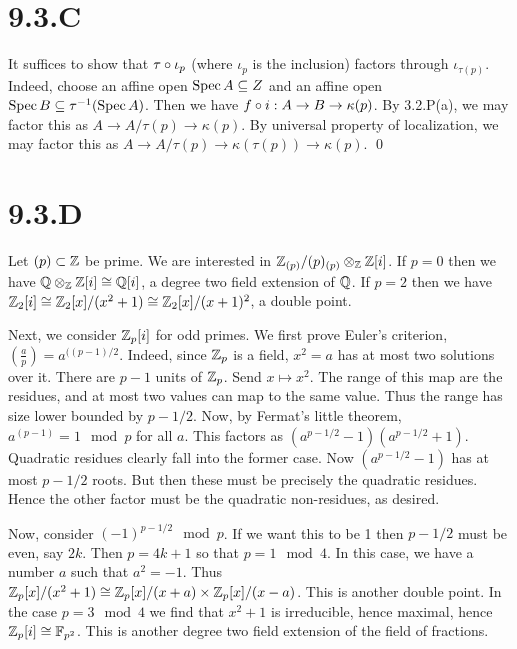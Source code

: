 \documentclass{article}
\begin{document}
\section{9.3.C}
It suffices to show that $\tau \circ \iota_p$ (where $\iota_p$
is the inclusion) factors through $\iota_{\tau(p)}$. Indeed, choose an
affine open $\operatorname{Spec} A \subseteq Z$ and an affine open $\operatorname{Spec} B \subseteq \tau^{-1}(\operatorname{Spec} A)$.
Then we have $f \circ i: A \to B \to \kappa(p)$. By 3.2.P(a), we may factor this as
$A \to A/\tau(p) \to \kappa(p)$. By universal property of localization, we may factor
this as $A \to A/\tau(p) \to \kappa(\tau(p)) \to
    \kappa(p)$. \qed

\section{9.3.D}
Let $(p) \subset \mathbb{Z}$ be prime. We are interested in
$\mathbb{Z}_{(p)}/(p)_{(p)}
    \otimes_{\mathbb{Z}} \mathbb{Z}[i]$. If $p=0$ then we have
$\mathbb{Q} \otimes_{\mathbb{Z}} \mathbb{Z}[i] \cong
    \mathbb{Q}[i]$, a degree two field extension of
$\mathbb{Q}$. If $p=2$ then we have
$\mathbb{Z}_2[i] \cong \mathbb{Z}_2[x]/(x^2+1) \cong
    \mathbb{Z}_2[x]/(x+1)^2$, a double point.

Next, we consider $\mathbb{Z}_p[i]$ for odd primes. We first prove
Euler's criterion, $(\frac{a}{p})=a^{((p-1)/2}$. Indeed, since
$\mathbb{Z}_p$ is a field, $x^2=a$ has at most two
solutions over it. There are $p-1$ units of
$\mathbb{Z}_p$. Send $x \mapsto x^2$. The range of this map
are the residues, and at most two values can map to the same value. Thus the
range has size lower bounded by $p-1/2$. Now, by Fermat's
little theorem, $a^(p-1)=1 \mod p$ for all $a$. This
factors as $(a^{p-1/2}-1)(a^{p-1/2}+1)$. Quadratic residues clearly fall into the
former case. Now $(a^{p-1/2}-1)$ has at most $p-1/2$
roots. But then these must be precisely the quadratic residues. Hence the other
factor must be the quadratic non-residues, as desired.

Now, consider $(-1)^{p-1/2} \mod p$. If we want this to be 1 then
$p-1/2$ must be even, say $2k$. Then
$p=4k+1$ so that $p = 1 \mod 4$. In this case, we have
a number $a$ such that $a^2=-1$. Thus
$\mathbb{Z}_p[x]/(x^2+1) \cong \mathbb{Z}_p[x]/(x+a) \times
    \mathbb{Z}_p[x]/(x-a)$. This is another double point. In the case
$p=3 \mod 4$ we find that $x^2+1$ is irreducible,
hence maximal, hence $\mathbb{Z}_p[i] \cong \mathbb{F}_{p^2}$. This is another degree two field
extension of the field of fractions.
\end{document}
